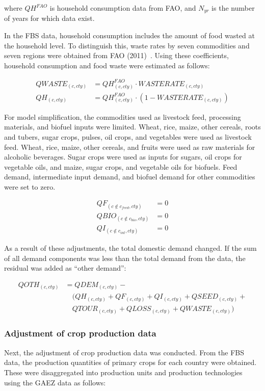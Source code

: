 where \( QH^{FAO} \) is household consumption data from FAO, 
and \( N_{yr} \) is the number of years for which data exist.

In the FBS data, household consumption includes the amount of food wasted at the household level. 
To distinguish this, waste rates by seven commodities and seven regions were obtained from FAO (2011)~\cite{faoGlobalFoodLossesAndFoodWaste2011}. 
Using these coefficients, household consumption and food waste were estimated as follows:

\begin{align}
QWASTE_{(c,cty)} &= QH^{FAO}_{(c,cty)} \cdot WASTERATE_{(c,cty)} \\
QH_{(c,cty)} &= QH^{FAO}_{(c,cty)} \cdot (1 - WASTERATE_{(c,cty)})
\end{align}

For model simplification, the commodities used as livestock feed, processing materials, and biofuel inputs were limited. 
Wheat, rice, maize, other cereals, roots and tubers, sugar crops, pulses, oil crops, and vegetables were used as livestock feed. 
Wheat, rice, maize, other cereals, and fruits were used as raw materials for alcoholic beverages. 
Sugar crops were used as inputs for sugars, oil crops for vegetable oils, and maize, sugar crops, and vegetable oils for biofuels. 
Feed demand, intermediate input demand, and biofuel demand for other commodities were set to zero.

\begin{align}
QF_{(c \notin c_{feed},cty)} &= 0 \\
QBIO_{(c \notin c_{bio},cty)} &= 0 \\
QI_{(c \notin c_{int},cty)} &= 0
\end{align}

As a result of these adjustments, the total domestic demand changed. 
If the sum of all demand components was less than the total demand from the data, 
the residual was added as “other demand”:

\begin{align}
QOTH_{(c,cty)} &= QDEM_{(c,cty)} - 
  \nonumber\\[-0.3em]
  &\quad
  \big(QH_{(c,cty)} + QF_{(c,cty)} + QI_{(c,cty)} + QSEED_{(c,cty)} + 
  \nonumber\\[-0.3em]
  &\quad
  QTOUR_{(c,cty)} + QLOSS_{(c,cty)} + QWASTE_{(c,cty)}\big)
\end{align}


\subsubsection{Adjustment of crop production data}
Next, the adjustment of crop production data was conducted. 
From the FBS data, the production quantities of primary crops for each country were obtained. 
These were disaggregated into production units and production technologies using the GAEZ data as follows:

